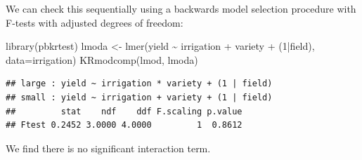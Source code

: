 \documentclass[
  ignorenonframetext,
]{beamer}
\newenvironment{Shaded}{\begin{snugshade}}{\end{snugshade}}
\newcommand{\AttributeTok}[1]{\textcolor[rgb]{0.77,0.63,0.00}{#1}}
\newcommand{\DecValTok}[1]{\textcolor[rgb]{0.00,0.00,0.81}{#1}}
\newcommand{\FunctionTok}[1]{\textcolor[rgb]{0.00,0.00,0.00}{#1}}
\newcommand{\NormalTok}[1]{#1}
\newcommand{\OtherTok}[1]{\textcolor[rgb]{0.56,0.35,0.01}{#1}}
\newcommand{\SpecialCharTok}[1]{\textcolor[rgb]{0.00,0.00,0.00}{#1}}
\begin{document}
\begin{frame}[fragile]{}
\protect\hypertarget{section-7}{}
We can check this sequentially using a backwards model selection
procedure with F-tests with adjusted degrees of freedom:

\vspace{12pt}
\tiny

\begin{Shaded}
\begin{Highlighting}[]
\FunctionTok{library}\NormalTok{(pbkrtest)}
\NormalTok{lmoda }\OtherTok{\textless{}{-}} \FunctionTok{lmer}\NormalTok{(yield }\SpecialCharTok{\textasciitilde{}}\NormalTok{ irrigation }\SpecialCharTok{+}\NormalTok{ variety }\SpecialCharTok{+}\NormalTok{ (}\DecValTok{1}\SpecialCharTok{|}\NormalTok{field), }\AttributeTok{data=}\NormalTok{irrigation)}
\FunctionTok{KRmodcomp}\NormalTok{(lmod, lmoda)}
\end{Highlighting}
\end{Shaded}

\begin{verbatim}
## large : yield ~ irrigation * variety + (1 | field)
## small : yield ~ irrigation + variety + (1 | field)
##         stat    ndf    ddf F.scaling p.value
## Ftest 0.2452 3.0000 4.0000         1  0.8612
\end{verbatim}

\vspace{12pt}
\normalsize

We find there is no significant interaction term.
\end{frame}
\end{document}
